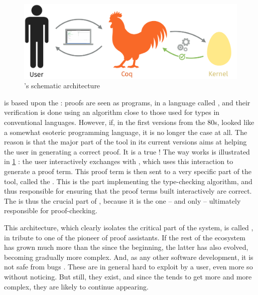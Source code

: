 \begin{figure}[h]

  \centering
  \includegraphics{./figures/coq-kernel-en.pdf}

  \caption{’s schematic architecture}
  \label{fig:coq-en}
\end{figure}

 is based upon the : proofs are seen as programs,
in a language called , and their verification is done using an algorithm
close to those used for types in conventional languages. However, if, in the first versions
from the 80s,  looked like a somewhat esoteric programming language, it is
no longer the case at all. The reason is that the major part of the tool in its
current versions aims at helping the user in generating a correct proof. It is a true
!
The way  works is illustrated in \cref{fig:coq-en} : the user interactively exchanges
with , which uses this interaction to generate a proof term. This proof term is then
sent to a very specific part of the tool, called the .
This is the part implementing the type-checking algorithm, and thus responsible for ensuring
that the proof terms built interactively are correct.
The  is thus the crucial part of , because it is the one – and only –
ultimately responsible for proof-checking.

This architecture, which clearly isolates the critical part of the system, is called
 , in tribute to one of the pioneer
of proof assistants.
If the rest of the ecosystem has grown much more than the  since the beginning,
the latter has also evolved, becoming gradually more complex.
And, as any other software development, it is not safe from bugs%
.
These are in general hard to exploit by a user, even more so without noticing.
But still, they exist, and since the  tends to get more and more complex, they
are likely to continue appearing.

